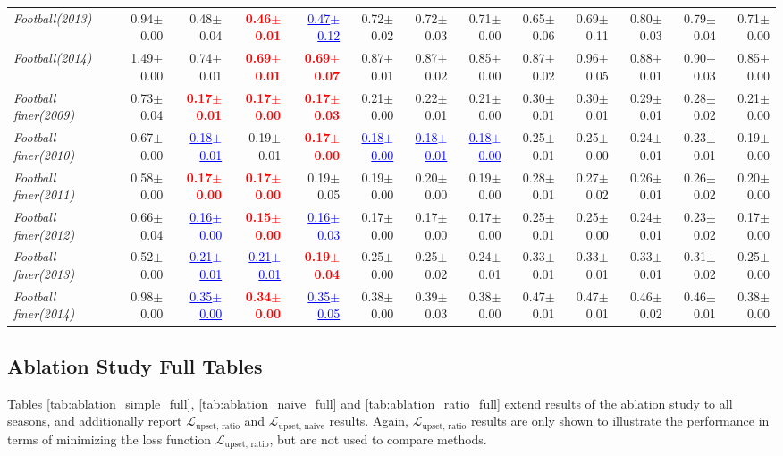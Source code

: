 \documentclass[nohyperref]{article}
\theoremstyle{plain}
\theoremstyle{definition}
\theoremstyle{remark}
\newcommand{\red}[1]{\textcolor{red}{\textbf{#1}}}
\newcommand{\blue}[1]{\textcolor{blue}{\underline{#1}}}
\begin{document}
\begin{table*}[!ht]
{\begin{tabular}{lrr|rrrrr|rrrrr}
			{\it Football(2013)} & 0.94$\pm$0.00 & 0.48$\pm$0.04 & \red{0.46$\pm$0.01} & \blue{0.47$\pm$0.12} & 0.72$\pm$0.02 & 0.72$\pm$0.03 & 0.71$\pm$0.00 & 0.65$\pm$0.06 & 0.69$\pm$0.11 & 0.80$\pm$0.03 & 0.79$\pm$0.04 & 0.71$\pm$0.00 \\
			{\it Football(2014)} & 1.49$\pm$0.00 & 0.74$\pm$0.01 & \red{0.69$\pm$0.01} & \red{0.69$\pm$0.07} & 0.87$\pm$0.01 & 0.87$\pm$0.02 & 0.85$\pm$0.00 & 0.87$\pm$0.02 & 0.96$\pm$0.05 & 0.88$\pm$0.01 & 0.90$\pm$0.03 & 0.85$\pm$0.00 \\
			{\it Football finer(2009)} & 0.73$\pm$0.04 & \red{0.17$\pm$0.01} & \red{0.17$\pm$0.00} & \red{0.17$\pm$0.03} & 0.21$\pm$0.00 & 0.22$\pm$0.01 & 0.21$\pm$0.00 & 0.30$\pm$0.01 & 0.30$\pm$0.01 & 0.29$\pm$0.01 & 0.28$\pm$0.02 & 0.21$\pm$0.00 \\
			{\it Football finer(2010)} & 0.67$\pm$0.00 & \blue{0.18$\pm$0.01} & 0.19$\pm$0.01 & \red{0.17$\pm$0.00} & \blue{0.18$\pm$0.00} & \blue{0.18$\pm$0.01} & \blue{0.18$\pm$0.00} & 0.25$\pm$0.01 & 0.25$\pm$0.00 & 0.24$\pm$0.01 & 0.23$\pm$0.01 & 0.19$\pm$0.00 \\
			{\it Football finer(2011)} & 0.58$\pm$0.00 & \red{0.17$\pm$0.00} & \red{0.17$\pm$0.00} & 0.19$\pm$0.05 & 0.19$\pm$0.00 & 0.20$\pm$0.00 & 0.19$\pm$0.00 & 0.28$\pm$0.01 & 0.27$\pm$0.02 & 0.26$\pm$0.01 & 0.26$\pm$0.02 & 0.20$\pm$0.00 \\
			{\it Football finer(2012)} & 0.66$\pm$0.04 & \blue{0.16$\pm$0.00} & \red{0.15$\pm$0.00} & \blue{0.16$\pm$0.03} & 0.17$\pm$0.00 & 0.17$\pm$0.00 & 0.17$\pm$0.00 & 0.25$\pm$0.01 & 0.25$\pm$0.00 & 0.24$\pm$0.01 & 0.23$\pm$0.02 & 0.17$\pm$0.00 \\
			{\it Football finer(2013)} & 0.52$\pm$0.00 & \blue{0.21$\pm$0.01} & \blue{0.21$\pm$0.01} & \red{0.19$\pm$0.04} & 0.25$\pm$0.00 & 0.25$\pm$0.02 & 0.24$\pm$0.01 & 0.33$\pm$0.01 & 0.33$\pm$0.01 & 0.33$\pm$0.01 & 0.31$\pm$0.02 & 0.25$\pm$0.00 \\
			{\it Football finer(2014)} & 0.98$\pm$0.00 & \blue{0.35$\pm$0.00} & \red{0.34$\pm$0.00} & \blue{0.35$\pm$0.05} & 0.38$\pm$0.00 & 0.39$\pm$0.03 & 0.38$\pm$0.00 & 0.47$\pm$0.01 & 0.47$\pm$0.01 & 0.46$\pm$0.02 & 0.46$\pm$0.01 & 0.38$\pm$0.00 \\
\bottomrule
\end{tabular}}
\end{table*}
\subsection{Ablation Study Full Tables}
\label{appendix_subsec:ablation_full}
Tables \ref{tab:ablation_simple_full}, \ref{tab:ablation_naive_full} and \ref{tab:ablation_ratio_full} extend results of the ablation study to all seasons, and additionally report $\mathcal{L}_\text{upset, ratio}$ and $\mathcal{L}_\text{upset, naive}$ results. Again, $\mathcal{L}_\text{upset, ratio}$ results are only  shown to illustrate the performance
in terms of minimizing the loss function $\mathcal{L}_\text{upset, ratio}$, but are not used to compare methods.
\end{document}
